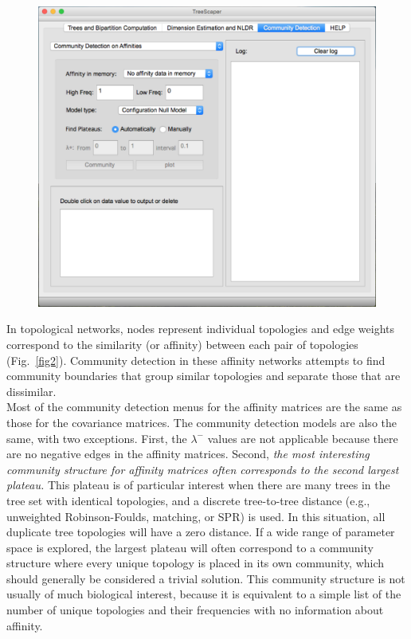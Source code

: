 \documentclass[11pt]{article}
\begin{document}
\begin{figure}[thbp!]\centering
\includegraphics[scale=0.4]{imagesForManual/image_10.png}
\end{figure}


In topological networks, nodes represent individual topologies and edge weights correspond
to the similarity (or affinity) between each pair of topologies (Fig.~\ref{fig2}). Community detection
in these affinity networks attempts to find community boundaries that group similar
topologies and separate those that are dissimilar. \\


Most of the community detection menus for the affinity matrices are the same as those for
the covariance matrices. The community detection models are also the same, with two
exceptions. First, the $\lambda^{-}$ values are not applicable because there are no negative edges in the affinity matrices. Second, {\it the most interesting community structure for affinity matrices often
corresponds to the second largest plateau.} This plateau is of particular interest when there are
many trees in the tree set with identical topologies, and a discrete tree-to-tree distance (e.g.,
unweighted Robinson-Foulds, matching, or SPR) is used. In this situation, all duplicate tree
topologies will have a zero distance. If a wide range of parameter space is explored, the largest
plateau will often correspond to a community structure where every unique topology is
placed in its own community, which should generally be considered a trivial solution. This
community structure is not usually of much biological interest, because it is equivalent to a
simple list of the number of unique topologies and their frequencies with no information
about affinity. \\
\end{document}
